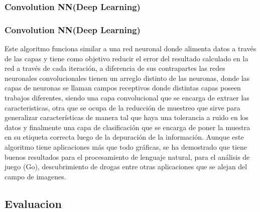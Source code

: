 \documentclass{beamer}
\begin{document}
\subsubsection{Convolution NN(Deep Learning)}
\begin{frame}
\frametitle{Convolution NN(Deep Learning)}
Este algoritmo funciona similar a una red neuronal donde alimenta datos a través de las capas y tiene como objetivo reducir el error del resultado calculado en la red a través de cada iteración, a diferencia de sus contrapartes las redes neuronales convolucionales tienen un arreglo distinto de las neuronas, donde las capas de neuronas se llaman campos receptivos donde distintas capas poseen trabajos diferentes, siendo una capa convolucional que se encarga de extraer las caracteristicas, otra que se ocupa de la reducción de muestreo que sirve para generalizar características de manera tal que haya una tolerancia a ruido en los datos y finalmente una capa de clasificación que se encarga de poner la muestra en su etiqueta correcta luego de la depuración de la información. Aunque este algoritmo tiene aplicaciones más que todo gráficas, se ha demostrado que tiene buenos resultados para el procesamiento de lenguaje natural, para el análisis de juego (Go), descubrimiento de drogas entre otras aplicaciones que se alejan del campo de imagenes.
\end{frame}
\subsection{Evaluacion}
\end{document}
